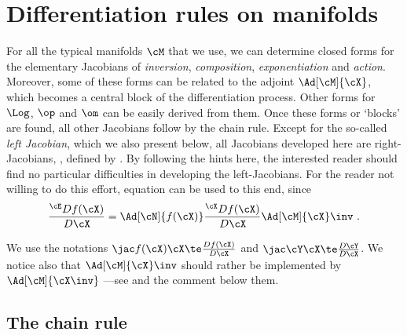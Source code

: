 
\section{Differentiation rules on manifolds}
\label{sec:derivatives_M}

For all the typical manifolds $\cM$ that we use, we can determine closed forms for the elementary Jacobians of \emph{inversion}, \emph{composition}, \emph{exponentiation} and \emph{action}.
Moreover, some of these forms can be related to the adjoint $\Ad[\cM]{\cX}$, which becomes a central block of the differentiation process.
Other forms for $\Log$, $\op$ and $\om$ can be easily derived from them.
Once these forms or `blocks' are found, all other Jacobians follow by the chain rule. 
Except for the so-called \emph{left Jacobian}, which we also present below, all Jacobians developed here are right-Jacobians, \ie, defined by .
By following the hints here, the interested reader should find no particular difficulties in developing the left-Jacobians.
For the reader not willing to do this effort, equation  can be used to this end, since
%
\begin{align}
\ldpar{f(\cX)}{\cX} = \Ad[\cN]{f(\cX)}\rdpar{f(\cX)}{\cX} \Ad[\cM]{\cX}\inv
~.
\end{align}


We use the notations $\mjac{f(\cX)}{\cX}\te\ndpar{f(\cX)}{\cX}$ and $\mjac{\cY}{\cX}\te\ndpar{\cY}{\cX}$.
We notice also that $\Ad[\cM]{\cX}\inv$ should rather be implemented by $\Ad[\cM]{\cX\inv}$ ---see  and the comment below them.



\subsection{The chain rule}
\label{sec:jacs_chain_rule}

